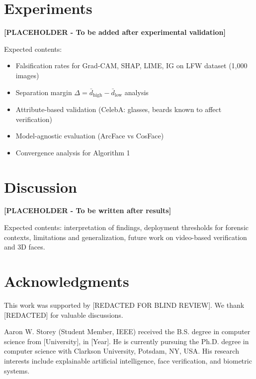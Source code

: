 \documentclass[journal]{IEEEtran}
\theoremstyle{definition}
\theoremstyle{remark}
\begin{document}
\IEEEpeerreviewmaketitle






\section{Experiments}
\label{sec:experiments}

\textbf{[PLACEHOLDER - To be added after experimental validation]}

Expected contents:
\begin{itemize}
    \item Falsification rates for Grad-CAM, SHAP, LIME, IG on LFW dataset (1,000 images)
    \item Separation margin $\Delta = \bar{d}_{\text{high}} - \bar{d}_{\text{low}}$ analysis
    \item Attribute-based validation (CelebA: glasses, beards known to affect verification)
    \item Model-agnostic evaluation (ArcFace vs CosFace)
    \item Convergence analysis for Algorithm 1
\end{itemize}

\section{Discussion}
\label{sec:discussion}

\textbf{[PLACEHOLDER - To be written after results]}

Expected contents: interpretation of findings, deployment thresholds for forensic contexts, limitations and generalization, future work on video-based verification and 3D faces.

\section*{Acknowledgments}
This work was supported by [REDACTED FOR BLIND REVIEW]. We thank [REDACTED] for valuable discussions.




\begin{IEEEbiography}{Aaron W. Storey}
(Student Member, IEEE) received the B.S. degree in computer science from [University], in [Year]. He is currently pursuing the Ph.D. degree in computer science with Clarkson University, Potsdam, NY, USA. His research interests include explainable artificial intelligence, face verification, and biometric systems.
\end{IEEEbiography}
\end{document}
